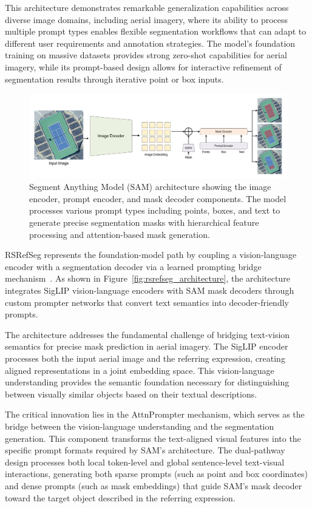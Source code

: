 This architecture demonstrates remarkable generalization capabilities across diverse image domains, including aerial imagery, where its ability to process multiple prompt types enables flexible segmentation workflows that can adapt to different user requirements and annotation strategies. The model's foundation training on massive datasets provides strong zero-shot capabilities for aerial imagery, while its prompt-based design allows for interactive refinement of segmentation results through iterative point or box inputs.

\begin{figure}[htbp]
\centering
\includegraphics[width=1.0\textwidth]{Images/sam.png}
\caption{Segment Anything Model (SAM) architecture showing the image encoder, prompt encoder, and mask decoder components. The model processes various prompt types including points, boxes, and text to generate precise segmentation masks with hierarchical feature processing and attention-based mask generation.}
\label{fig:sam_architecture}
\end{figure}

RSRefSeg represents the foundation-model path by coupling a vision-language encoder with a segmentation decoder via a learned prompting bridge mechanism~\cite{chen2025rsrefseg}. As shown in Figure~\ref{fig:rsrefseg_architecture}, the architecture integrates SigLIP vision-language encoders with SAM mask decoders through custom prompter networks that convert text semantics into decoder-friendly prompts.

The architecture addresses the fundamental challenge of bridging text-vision semantics for precise mask prediction in aerial imagery. The SigLIP encoder processes both the input aerial image and the referring expression, creating aligned representations in a joint embedding space. This vision-language understanding provides the semantic foundation necessary for distinguishing between visually similar objects based on their textual descriptions.

The critical innovation lies in the AttnPrompter mechanism, which serves as the bridge between the vision-language understanding and the segmentation generation. This component transforms the text-aligned visual features into the specific prompt formats required by SAM's architecture. The dual-pathway design processes both local token-level and global sentence-level text-visual interactions, generating both sparse prompts (such as point and box coordinates) and dense prompts (such as mask embeddings) that guide SAM's mask decoder toward the target object described in the referring expression.

